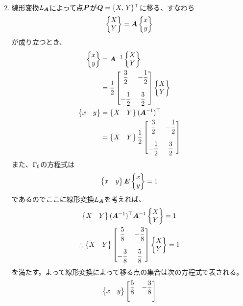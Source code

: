 \begin{ans*}
\begin{enumerate}[label=(\arabic*)]
\begin{enumerate}[label=(\roman*)]
\begin{gather}
{        }
      \end{gather}
    \end{enumerate}
    \item
    線形変換$L_{\bm{A}}$によって点$\bm{P}$が$\bm{Q} = \{X,\,Y\}^{\top}$に移る、すなわち
    \begin{gather}
      \begin{Bmatrix}X \\ Y\end{Bmatrix} = \bm{A}\begin{Bmatrix}x \\ y\end{Bmatrix} \\
    \end{gather}
    が成り立つとき、
    \begin{align}
      \begin{Bmatrix}x \\ y\end{Bmatrix}
      &= \bm{A}^{-1}\begin{Bmatrix}X \\ Y\end{Bmatrix} \\
      &= \frac{1}{2}\begin{bmatrix}
        \displaystyle\frac{3}{2} & \displaystyle -\frac{1}{2} \\
        &\\
        \displaystyle -\frac{1}{2} & \displaystyle \frac{3}{2}
      \end{bmatrix}\begin{Bmatrix}X \\ Y\end{Bmatrix} \\
      \begin{Bmatrix}x & y\end{Bmatrix}
      &= \begin{Bmatrix}X & Y\end{Bmatrix}(\bm{A}^{-1})^{\top} \\
      &= \begin{Bmatrix}X & Y\end{Bmatrix}\frac{1}{2}\begin{bmatrix}
        \displaystyle\frac{3}{2} & \displaystyle -\frac{1}{2} \\
        &\\
        \displaystyle -\frac{1}{2} & \displaystyle \frac{3}{2}
      \end{bmatrix}
    \end{align}
    また、${\Gamma}_{0}$の方程式は
    \begin{gather}
      \begin{Bmatrix}x & y\end{Bmatrix} \bm{E} \begin{Bmatrix}x \\ y\end{Bmatrix} = 1
    \end{gather}
    であるのでここに線形変換$L_{\bm{A}}$を考えれば、
    \begin{gather}
      \begin{Bmatrix}X & Y\end{Bmatrix} (\bm{A}^{-1})^{\top} \bm{A}^{-1} \begin{Bmatrix}X \\ Y\end{Bmatrix} = 1 \\
      \therefore
      \begin{Bmatrix}X & Y\end{Bmatrix} \begin{bmatrix}
        \displaystyle \frac{5}{8} & \displaystyle -\frac{3}{8} \\
        & \\
        \displaystyle -\frac{3}{8} & \displaystyle \frac{5}{8}
      \end{bmatrix}\begin{Bmatrix}X \\ Y\end{Bmatrix} = 1
    \end{gather}
    を満たす。よって線形変換によって移る点の集合は次の方程式で表される。
    \begin{gather}
      \begin{Bmatrix}x & y\end{Bmatrix} \begin{bmatrix}
        \displaystyle \frac{5}{8} & \displaystyle -\frac{3}{8} \\
        & \\
\end{bmatrix}
\end{gather}
\end{enumerate}
\end{ans*}
